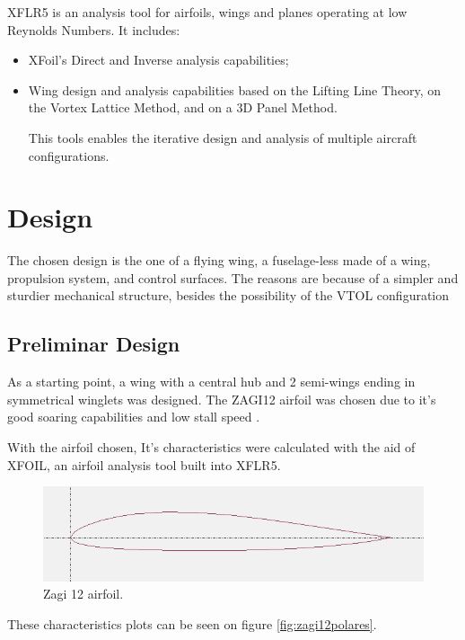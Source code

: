 XFLR5 is an analysis tool for airfoils, wings and planes operating at low Reynolds Numbers. It includes:
\begin{itemize}

\item XFoil's Direct and Inverse analysis capabilities;
\item Wing design and analysis capabilities based on the Lifting Line Theory, on the Vortex Lattice Method, and on a 3D Panel Method.

This tools enables the iterative design and analysis of multiple aircraft configurations.


\end{itemize}


\section{Design}

The chosen design is the one of a flying wing, a fuselage-less made of a wing, propulsion system, and control surfaces. The reasons are because of a simpler and sturdier mechanical structure, besides the possibility of the VTOL configuration

\subsection{Preliminar Design}

As a starting point, a wing with a central hub and 2 semi-wings ending in symmetrical winglets was designed. The ZAGI12 airfoil was chosen due to it's good soaring capabilities and low stall speed .

With the airfoil chosen, It's characteristics were calculated with the aid of XFOIL, an airfoil analysis tool built into XFLR5.

\begin{figure}
\centering
  \includegraphics[width=\linewidth]{figs/zagi12.png}
  \caption{Zagi 12 airfoil.}
  \label{fig:zagi12}
\end{figure}


These characteristics plots can be seen on figure \ref{fig:zagi12polares}.
%

